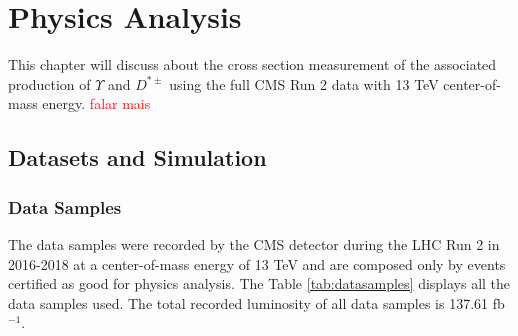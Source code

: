 \chapter{Physics Analysis}

This chapter will discuss about the cross section measurement of the associated production of $\Upsilon$ and $D^{*\pm}$ using the full CMS Run 2 data with 13 TeV center-of-mass energy. \textcolor{red}{falar mais}

\section{Datasets and Simulation}
\subsection{Data Samples}

The data samples were recorded by the CMS detector during the LHC Run 2 in 2016-2018 at a center-of-mass energy of 13 TeV and are composed only by events certified as good for physics analysis. The Table \ref{tab:datasamples} displays all the data samples used. The total recorded luminosity of all data samples is 137.61 fb$^{-1}$.


